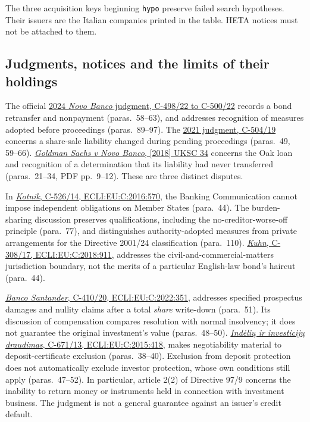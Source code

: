 The three acquisition keys beginning \texttt{hypo} preserve failed search
hypotheses. Their issuers are the Italian companies printed in the table.
HETA notices must not be attached to them.

\subsection{Judgments, notices and the limits of their holdings}

The official \href{../prospectus/corner-cases-2026-10-04/sources/jur-more-c498-judgment/source.html}
{2024 \emph{Novo Banco} judgment, C-498/22 to C-500/22}
records a bond retransfer and nonpayment (paras.~58--63), and addresses
recognition of measures adopted before proceedings (paras.~89--97).
The \href{../prospectus/corner-cases-2026-10-04/sources/jur-more-novo2021-judgment/source.html}
{2021 judgment, C-504/19}
concerns a share-sale liability changed during pending proceedings
(paras.~49, 59--66).
\href{../prospectus/corner-cases-2026-10-04/sources/jur-more-novo-generated/source.pdf}
{\emph{Goldman Sachs v Novo Banco}, [2018] UKSC 34}
concerns the Oak loan and recognition of a determination that its liability
had never transferred (paras.~21--34, PDF pp.~9--12).
These are three distinct disputes.

In \href{../prospectus/corner-cases-2026-10-04/sources/jur-more-kotnik-judgment/source.html}
{\emph{Kotnik}, C-526/14, ECLI:EU:C:2016:570},
the Banking Communication cannot impose independent obligations on Member
States (para.~44). The burden-sharing discussion preserves qualifications,
including the no-creditor-worse-off principle (para.~77), and distinguishes
authority-adopted measures from private arrangements for the Directive
2001/24 classification (para.~110).
\href{../prospectus/corner-cases-2026-10-04/sources/jur-more-kuhn-judgment/source.html}
{\emph{Kuhn}, C-308/17, ECLI:EU:C:2018:911},
addresses the civil-and-commercial-matters jurisdiction boundary, not
the merits of a particular English-law bond's haircut (para.~44).

\href{../prospectus/corner-cases-2026-10-04/sources/jur-more-santander-judgment/source.html}
{\emph{Banco Santander}, C-410/20, ECLI:EU:C:2022:351},
addresses specified prospectus damages and nullity claims after a total
\emph{share} write-down (para.~51). Its discussion of compensation compares
resolution with normal insolvency; it does not guarantee the original
investment's value (paras.~48--50).
\href{../prospectus/corner-cases-2026-10-04/sources/jur-more-indel-judgment/source.html}
{\emph{Indėlių ir investicijų draudimas}, C-671/13, ECLI:EU:C:2015:418},
makes negotiability material to deposit-certificate exclusion
(paras.~38--40). Exclusion from deposit protection does not automatically
exclude investor protection, whose own conditions still apply
(paras.~47--52). In particular, article 2(2) of Directive 97/9 concerns
the inability to return money or instruments held in connection with
investment business. The judgment is not a general guarantee against
an issuer's credit default.


